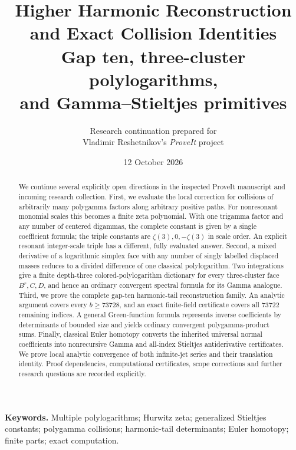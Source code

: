 \documentclass[11pt,a4paper]{article}
\title{\textbf{Higher Harmonic Reconstruction\\and Exact Collision Identities}\\[5pt]
  \large Gap ten, three-cluster polylogarithms,\\and Gamma--Stieltjes primitives}
\author{Research continuation prepared for\\Vladimir Reshetnikov's \emph{ProveIt} project}
\date{12 October 2026}
\theoremstyle{definition}
\theoremstyle{remark}
\numberwithin{equation}{section}
\begin{document}
\maketitle
\begin{abstract}
We continue several explicitly open directions in the inspected ProveIt
manuscript and incoming research collection. First, we evaluate the local
correction for collisions of arbitrarily many polygamma factors along
arbitrary positive paths. For nonresonant monomial scales this becomes a
finite zeta polynomial. With one trigamma factor and any number of centered
digammas, the complete constant is given by a single coefficient formula;
the triple constants are $\zeta(3),0,-\zeta(3)$ in scale order. An explicit
resonant integer-scale triple has a different, fully evaluated answer.
Second, a mixed derivative of a logarithmic simplex face with any number
of singly labelled displaced masses reduces to a divided difference of
one classical polylogarithm. Two integrations give a finite depth-three
colored-polylogarithm dictionary for every three-cluster face $B^r,C,D$,
and hence an ordinary convergent spectral formula for its Gamma analogue.
Third, we prove the complete gap-ten harmonic-tail reconstruction family.
An analytic argument covers every $b\ge73728$, and an exact finite-field
certificate covers all $73722$ remaining indices. A general Green-function
formula represents inverse coefficients by determinants of bounded size
and yields ordinary convergent polygamma-product sums. Finally, classical
Euler homotopy converts the inherited universal normal coefficients into
nonrecursive Gamma and all-index Stieltjes antiderivative certificates.
We prove local analytic convergence of both infinite-jet series and their
translation identity. Proof dependencies, computational certificates,
scope corrections and further research questions are recorded explicitly.
\end{abstract}
\noindent\textbf{Keywords.} Multiple polylogarithms; Hurwitz zeta;
generalized Stieltjes constants; polygamma collisions; harmonic-tail
determinants; Euler homotopy; finite parts; exact computation.

\clearpage
{\setlength{\parskip}{0pt}\small\tableofcontents}
\clearpage
\end{document}
